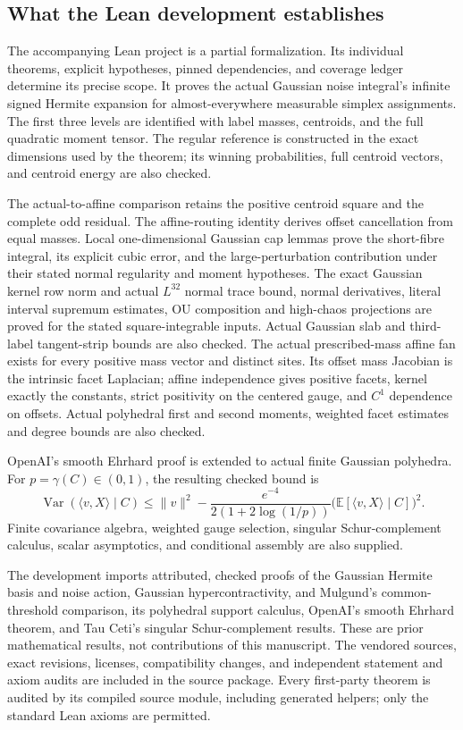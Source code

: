 \subsection{What the Lean development establishes}
The accompanying Lean project is a partial formalization. Its individual
theorems, explicit hypotheses, pinned dependencies, and coverage ledger
determine its precise scope. It proves the actual Gaussian noise integral's
infinite signed Hermite expansion for almost-everywhere measurable simplex
assignments. The first three levels are identified with label masses,
centroids, and the full quadratic moment tensor. The regular reference is
constructed in the exact dimensions used by the theorem; its winning
probabilities, full centroid vectors, and centroid energy are also checked.

The actual-to-affine comparison retains the positive centroid square and
the complete odd residual. The affine-routing identity derives offset
cancellation from equal masses. Local one-dimensional Gaussian cap lemmas
prove the short-fibre integral, its explicit cubic error, and the
large-perturbation contribution under their stated normal regularity and
moment hypotheses. The exact Gaussian kernel row norm and actual $L^{32}$ normal
trace bound, normal derivatives, literal interval supremum estimates,
OU composition and high-chaos projections are proved for the stated
square-integrable inputs. Actual
Gaussian slab and third-label tangent-strip bounds are also checked.
The actual prescribed-mass affine fan exists for every positive mass vector
and distinct sites. Its offset mass Jacobian is the intrinsic facet
Laplacian; affine independence gives positive facets, kernel exactly the
constants, strict positivity on the centered gauge, and $C^1$ dependence
on offsets. Actual polyhedral first and second moments, weighted facet
estimates and degree bounds are also checked.

OpenAI's smooth Ehrhard proof is extended to actual finite Gaussian
polyhedra. For $p=\gamma(C)\in(0,1)$, the resulting checked bound is
\[
 \operatorname{Var}(\langle v,X\rangle\mid C)
 \le \|v\|^2-
 \frac{e^{-4}}{2(1+2\log(1/p))}
 \bigl(\mathbb E[\langle v,X\rangle\mid C]\bigr)^2.
\]
Finite covariance algebra, weighted gauge selection, singular
Schur-complement calculus, scalar asymptotics, and conditional assembly
are also supplied.

The development imports attributed, checked proofs of the Gaussian Hermite
basis and noise action, Gaussian hypercontractivity, and Mulgund's
common-threshold comparison, its polyhedral support calculus, OpenAI's
smooth Ehrhard theorem, and Tau Ceti's singular Schur-complement results.
These are prior mathematical results, not
contributions of this manuscript. The vendored sources, exact revisions,
licenses, compatibility changes, and independent statement and axiom audits
are included in the source package. Every first-party theorem is audited by
its compiled source module, including generated helpers; only the standard
Lean axioms are permitted.

